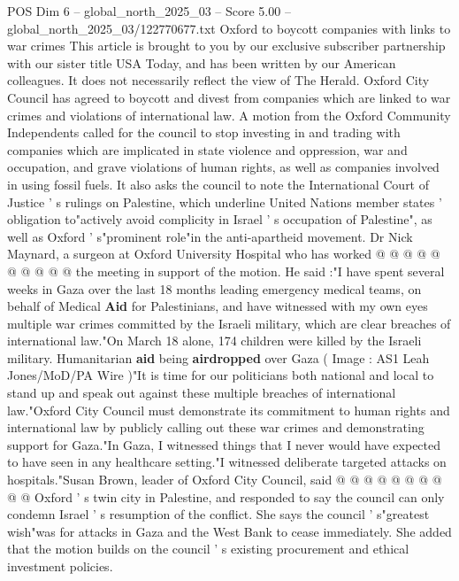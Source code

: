\begin{textsample}{POS Dim 6 – global\_north\_2025\_03 – Score 5.00 – global\_north\_2025\_03/122770677.txt}  \label{ex:f6_pos_275}
Oxford to boycott companies with links to war crimes This article is brought to you by our exclusive subscriber partnership with our sister title USA Today, and has been written by our American colleagues.
It does not necessarily reflect the view of The Herald.
Oxford City Council has agreed to boycott and divest from companies which are linked to war crimes and violations of international law.
A motion from the Oxford Community Independents called for the council to stop investing in and trading with companies which are implicated in state violence and oppression, war and occupation, and grave violations of human rights, as well as companies involved in using fossil fuels.
It also asks the council to note the International Court of Justice ' s rulings on Palestine, which underline United Nations member states ' obligation to"actively avoid complicity in Israel ' s occupation of Palestine", as well as Oxford ' s"prominent role"in the anti-apartheid movement.
Dr Nick Maynard, a surgeon at Oxford University Hospital who has worked @ @ @ @ @ @ @ @ @ @ the meeting in support of the motion.
He said :"I have spent several weeks in Gaza over the last 18 months leading emergency medical teams, on behalf of Medical \textbf{Aid} for Palestinians, and have witnessed with my own eyes multiple war crimes committed by the Israeli military, which are clear breaches of international law."On March 18 alone, 174 children were killed by the Israeli military.
Humanitarian \textbf{aid} being \textbf{airdropped} over Gaza ( Image : AS1 Leah Jones/MoD/PA Wire )"It is time for our politicians both national and local to stand up and speak out against these multiple breaches of international law."Oxford City Council must demonstrate its commitment to human rights and international law by publicly calling out these war crimes and demonstrating support for Gaza."In Gaza, I witnessed things that I never would have expected to have seen in any healthcare setting."I witnessed deliberate targeted attacks on hospitals."Susan Brown, leader of Oxford City Council, said @ @ @ @ @ @ @ @ @ @ Oxford ' s twin city in Palestine, and responded to say the council can only condemn Israel ' s resumption of the conflict.
She says the council ' s"greatest wish"was for attacks in Gaza and the West Bank to cease immediately.
She added that the motion builds on the council ' s existing procurement and ethical investment policies.

\end{textsample}

